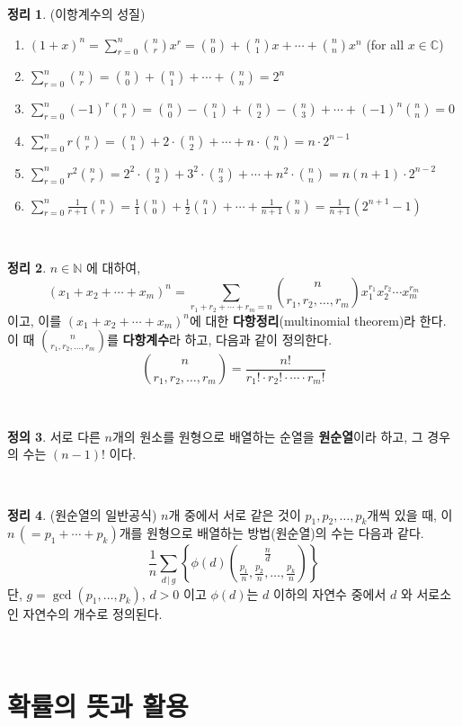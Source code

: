 \documentclass[12pt]{article}
\theoremstyle{definition}
\newtheorem{theorem}{\sffamily 정리}[section]
\theoremstyle{definition}
\newtheorem{definition}[theorem]{\sffamily 정의}
\newcommand{\defn}[1]{\begin{definition}#1\end{definition}~}
\newcommand{\thm}[1]{\begin{theorem}{#1}\end{theorem}~}
\newcommand{\ds}{\displaystyle}
\begin{document}
\thm{(이항계수의 성질)
\begin{enumerate}
	\item[(1)] $\ds (1+x)^n = \sum_{r=0}^n {n\choose r}x^r={n \choose 0} + {n\choose 1}x + \cdots + {n\choose n}x^n$ \quad (for all $x\in \mathbb{C}$)
	\item[(2)] $\ds \sum_{r=0}^n {n\choose r} = {n \choose 0} + {n \choose 1}+\cdots + {n \choose n} = 2^n$
	\item[(3)] $\ds \sum_{r=0}^n (-1)^r {n\choose r} = {n \choose 0} - {n \choose 1} + {n \choose 2} - {n \choose 3} +\cdots + (-1)^n{n \choose n} = 0$
	\item[(4)] $\ds \sum_{r=0}^nr{n\choose r} ={n \choose 1} + 2\cdot {n \choose 2} + \cdots + n\cdot {n \choose n} = n\cdot 2^{n-1}$
	\item[(5)] $\ds \sum_{r=0}^nr^2{n\choose r} = 2^2\cdot {n \choose 2} +3^2\cdot {n \choose 3} + \cdots + n^2\cdot {n \choose n} = n(n+1)\cdot 2^{n-2}$
	\item[(6)] $\ds \sum_{r=0}^n \frac{1}{r+1}{n\choose r}=\frac{1}{1}{n\choose 0} + \frac{1}{2}{n\choose 1} + \cdots + \frac{1}{n+1}{n\choose n} = \frac{1}{n+1}\left(2^{n+1}-1\right)$
\end{enumerate}}

\thm{$n\in\mathbb{N}$ 에 대하여, $$(x_1+x_2+\cdots+x_m)^n = \sum_{r_1+r_2+\cdots+r_m=n} {n\choose r_1, r_2, \dots, r_m}x_1^{r_1}x_2^{r_2}\cdots x_m^{r_m} $$ 이고, 이를 $(x_1+x_2+\cdots+x_m)^n$에 대한 \textbf{다항정리}(multinomial theorem)라 한다. 이 때 $\ds{n\choose r_1, r_2, \dots, r_m}$를 \textbf{다항계수}라 하고, 다음과 같이 정의한다. $${n\choose r_1, r_2, \dots, r_m} = \frac{n!}{r_1!\cdot r_2!\cdot \cdots \cdot r_m!}$$}

\defn{서로 다른 $n$개의 원소를 원형으로 배열하는 순열을 \textbf{원순열}이라 하고, 그 경우의 수는 $(n-1)!$ 이다.}

\thm{(원순열의 일반공식) $n$개 중에서 서로 같은 것이 $p_1, p_2, \dots, p_k$개씩 있을 때, 이 $n\,(=p_1+\cdots+p_k)$개를 원형으로 배열하는 방법(원순열)의 수는 다음과 같다.
$$\frac{1}{n}\sum_{d\,|\,g} \left\{\phi(d) {\frac{n}{d}\choose \frac{p_1}{n},\frac{p_2}{n},\dots,\frac{p_k}{n}}  \right\}$$
단, $g = \gcd(p_1, \dots, p_k)$, $d>0$ 이고 $\phi(d)$는 $d$ 이하의 자연수 중에서 $d$ 와 서로소인 자연수의 개수로 정의된다. 
}

\pagebreak
\section{확률의 뜻과 활용}
\end{document}
